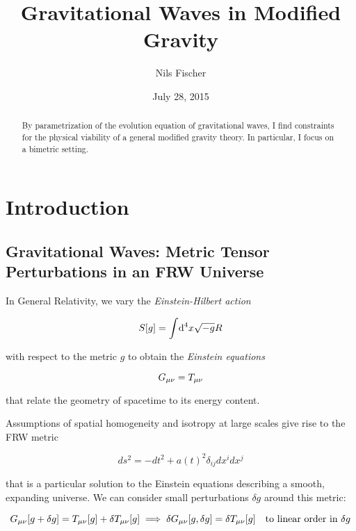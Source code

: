 \documentclass[parskip=half]{scrreprt}
\title{Gravitational Waves in Modified Gravity}
\author{Nils Fischer}
\date{July 28, 2015}
\begin{document}
\maketitle

\begin{abstract}
	By parametrization of the evolution equation of gravitational waves, I find constraints for the physical viability of a general modified gravity theory. In particular, I focus on a bimetric setting.
\end{abstract}


\tableofcontents


\chapter{Introduction}


\section{Gravitational Waves: Metric Tensor Perturbations in an FRW Universe} %

In General Relativity, we vary the \emph{Einstein-Hilbert action}

\begin{align}\label{eq:einstein_hilbert_action}
	S[g] = \int \! \mathrm{d}^4 x \sqrt{-g} R
\end{align}

with respect to the metric $g$ to obtain the \emph{Einstein equations}

\begin{equation}
	G_{\mu \nu} = T_{\mu \nu}
\end{equation}

that relate the geometry of spacetime to its energy content.

Assumptions of spatial homogeneity and isotropy at large scales give rise to the FRW metric

\begin{equation}
	ds^2 = -dt^2 + a(t)^2 \delta_{ij} dx^i dx^j
\end{equation}

that is a particular solution to the Einstein equations describing a smooth, expanding universe. We can consider small perturbations $\delta g$ around this metric: 

\begin{equation}
	G_{\mu \nu}[g + \delta g] = T_{\mu \nu}[g] + \delta T_{\mu \nu}[g]
	\implies \delta G_{\mu \nu}[g,\delta g] = \delta T_{\mu \nu}[g] \quad \textrm{to linear order in $\delta g$}
\end{equation}
\end{document}
